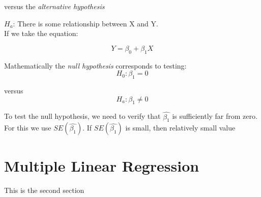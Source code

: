 \documentclass{article}
\begin{document}
	versus the \textit{alternative hypothesis}
	
	$H_a$: There is some relationship between X and Y.
	\\
	
	If we take the equation:
	
	\begin{equation}
		Y = \beta_0 + \beta_1X
	\end{equation}

	Mathematically the \textit{null hypothesis} corresponds to testing:
	\begin{equation}
		H_0 : \beta_1 = 0
	\end{equation}

	versus
	\begin{equation}
		H_a : \beta_1 \neq 0
	\end{equation}

	
	To test the null hypothesis, we need to verify that $\hat{\beta_1}$ is sufficiently far from zero. For this we use $SE(\hat{\beta_1})$. If $SE(\hat{\beta_1})$ is small, then relatively small value
	
	\section{Multiple Linear Regression}
	This is the second section
\end{document}
